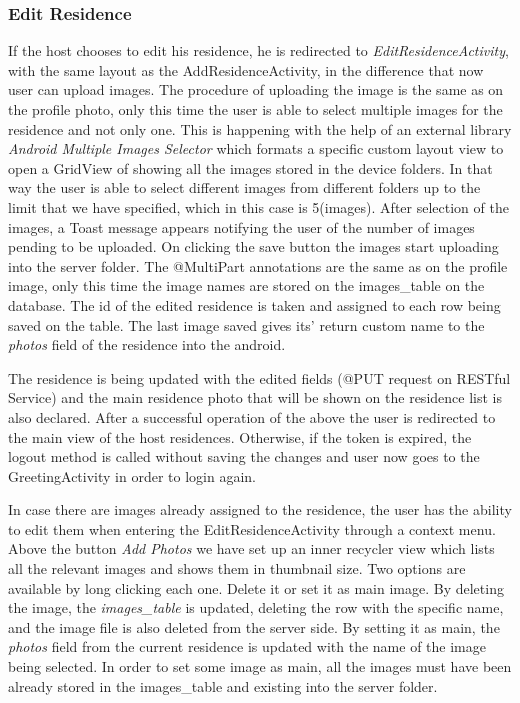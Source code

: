 \documentclass[12pt]{article}
\begin{document}
	\subsubsection{Edit Residence}
	If the host chooses to edit his residence, he is redirected to \textit{EditResidenceActivity}, with the same layout as the AddResidenceActivity, in the difference that now user can upload images.
	The procedure of uploading the image is the same as on the profile photo, only this time the user is able to select multiple images for the residence and not only one. This is happening with the help of an external library \textit{Android Multiple Images Selector} which formats a specific custom layout view to open a GridView of showing all the images stored in the device folders. In that way the user is able to select different images from different folders up to the limit that we have specified, which in this case is 5(images). After selection of the images, a Toast message appears notifying the user of the number of images pending to be uploaded. On clicking the save button the images start uploading into the server folder. The @MultiPart annotations are the same as on the profile image, only this time the image names are stored on the images\_table on the database. The id of the edited residence is taken and assigned to each row being saved on the table. The last image saved gives its' return custom name to the \textit{photos} field of the residence into the android. 
	
	The residence is being updated with the edited fields (@PUT request on RESTful Service) and the main residence photo that will be shown on the residence list is also declared. After a successful operation of the above the user is redirected to the main view of the host residences. Otherwise, if the token is expired, the logout method is called without saving the changes and user now goes to the GreetingActivity in order to login again.
	
	In case there are images already assigned to the residence, the user has the ability to edit them when entering the EditResidenceActivity through a context menu. Above the button \textit{Add Photos} we have set up an inner recycler view which lists all the relevant images and shows them in thumbnail size. Two options are available by long clicking each one. Delete it or set it as main image. By deleting the image, the \textit{images\_table} is updated, deleting the row with the specific name, and the image file is also deleted from the server side. By setting it as main, the \textit{photos} field from the current residence is updated with the name of the image being selected. In order to set some image as main, all the images must have been already stored in the images\_table and existing into the server folder.
	
\end{document}

